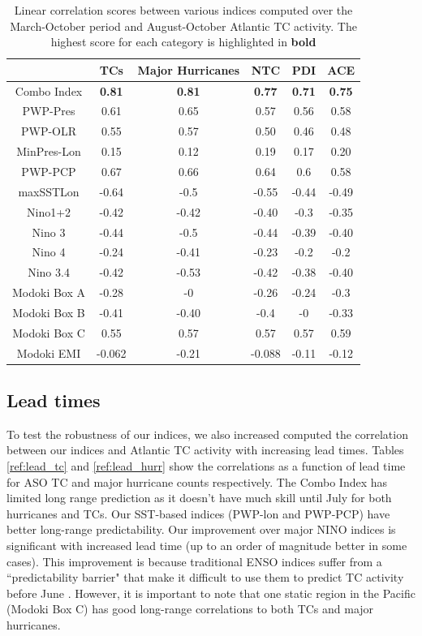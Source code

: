 \documentclass[]{article}
\begin{document}
\begin{table}
\begin{tabular}{cccccc}
\hline
&TCs & Major Hurricanes & NTC & PDI & ACE\\
\hline
Combo Index  & \textbf{0.81} & \textbf{0.81} & \textbf{0.77} & \textbf{0.71} & \textbf{0.75}\\
PWP-Pres & 0.61 & 0.65 & 0.57 & 0.56 & 0.58\\
PWP-OLR & 0.55 & 0.57 & 0.50 & 0.46 & 0.48\\
MinPres-Lon & 0.15 & 0.12 & 0.19 & 0.17 & 0.20\\
PWP-PCP  & 0.67 & 0.66 & 0.64 & 0.6 & 0.58\\
maxSSTLon & -0.64 & -0.5 & -0.55 & -0.44 & -0.49\\
Nino1+2 & -0.42 & -0.42 & -0.40 & -0.3 & -0.35\\
Nino 3 & -0.44 & -0.5 & -0.44 & -0.39 & -0.40\\
Nino 4 & -0.24 & -0.41 & -0.23 & -0.2 & -0.2\\
Nino 3.4 & -0.42 & -0.53 & -0.42 & -0.38 & -0.40\\
Modoki Box A & -0.28 & -0 & -0.26 & -0.24 & -0.3\\
Modoki Box B & -0.41 & -0.40 & -0.4 & -0 & -0.33\\
Modoki Box C & 0.55 & 0.57 & 0.57 & 0.57 & 0.59\\
Modoki EMI & -0.062 & -0.21 & -0.088 & -0.11 & -0.12\\
\hline
\end{tabular}
\caption{Linear correlation scores between various indices computed over the March-October period and August-October Atlantic TC activity. The highest score for each category is highlighted in \textbf{bold}}
\label{ref:lin_corr}
\end{table}

\subsection{Lead times}
To test the robustness of our indices, we also increased computed the correlation between our indices and Atlantic TC activity with increasing lead times. Tables \ref{ref:lead_tc} and  \ref{ref:lead_hurr} show the correlations as a function of lead time for ASO TC and major hurricane counts respectively. The Combo Index has limited long range prediction as it doesn't have much skill until July for both hurricanes and TCs. Our SST-based indices (PWP-lon and PWP-PCP) have better long-range predictability. Our improvement over major NINO indices is significant with increased lead time (up to an order of magnitude better in some cases). This improvement is because traditional ENSO indices suffer from a ``predictability barrier" that make it difficult to use them to predict TC activity before June \cite{webster1992}. However, it is important to note that one static region in the Pacific (Modoki Box C) has good long-range correlations to both TCs and major hurricanes. 
\end{document}
